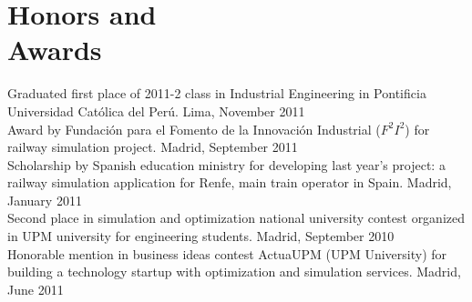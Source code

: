 	\section{Honors and\\Awards }
   
   				Graduated first place of 2011-2 class in Industrial Engineering in Pontificia Universidad Católica del Perú. \hfill Lima, November 2011 \vspace{1mm} \\
    			Award by Fundación para el Fomento de la Innovación Industrial ($F^2I^2$) for railway simulation project. \hfill Madrid, September 2011 \vspace{1mm} \\
    			Scholarship by Spanish education ministry for developing last year's project: a railway simulation application for Renfe, main train operator in Spain. \hfill Madrid, January 2011 \vspace{1mm}\\%
   				Second place in simulation and optimization national university contest organized in UPM university for engineering students. \hfill Madrid, September 2010 \vspace{1mm}\\%
   				Honorable mention in business ideas contest ActuaUPM (UPM University) for building a technology startup with optimization and simulation services. \hfill Madrid, June 2011 \vspace{1mm}\\%

